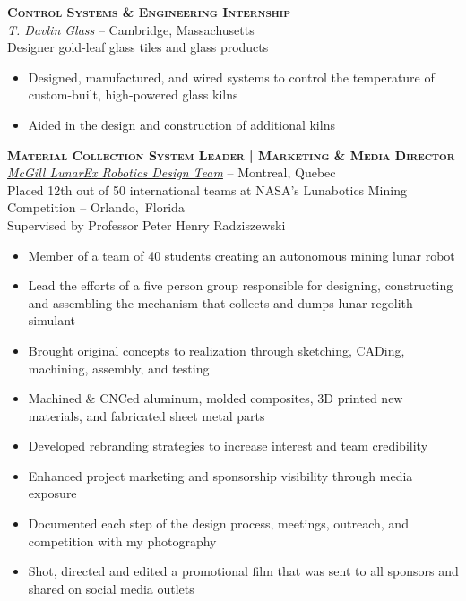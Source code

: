 \documentclass[12pt, letterpaper]{article}
\newcommand{\years}[1]{\marginnote{\footnotesize #1}} %
\begin{document}

	\begin{samepage}
		\years{Summer 2013} \textbf{\scshape Control Systems \& Engineering Internship}\\
		\textit{T. Davlin Glass} -- Cambridge, Massachusetts\\
		{\small Designer gold-leaf glass tiles and glass products}
		\begin{itemize}
			\item Designed, manufactured, and wired systems to control the temperature of custom-built, high-powered glass kilns
			\item Aided in the design and construction of additional kilns
		\end{itemize}
	\end {samepage}
	\vspace{.1in}

	\begin{samepage}
		\years{8/2012 - 8/2013} \textbf{\scshape Material Collection System Leader | Marketing \& Media Director}\\
		\href{http://www.lunarex.mcgill.ca}{\textit{McGill LunarEx Robotics Design Team}} -- Montreal, Quebec\\
		{\small Placed 12th out of 50 international teams at NASA's Lunabotics Mining Competition -- Orlando,~Florida\\
		Supervised by Professor Peter Henry Radziszewski}
		\begin{itemize}
			\item Member of a team of 40 students creating an autonomous mining lunar robot 
			\item Lead the efforts of a five person group responsible for designing, constructing and assembling the mechanism that collects and dumps lunar regolith simulant
			\item Brought original concepts to realization through sketching, CADing, machining, assembly, and testing
			\item Machined \& CNCed aluminum, molded composites, 3D printed new materials, and fabricated sheet metal parts
			\item Developed rebranding strategies to increase interest and team credibility
			\item Enhanced project marketing and sponsorship visibility through media exposure
			\item Documented each step of the design process,  meetings, outreach, and competition with my photography
			\item Shot, directed and edited a promotional film that was sent to all sponsors and shared on social media outlets
		\end{itemize}
	\end {samepage}
	\vspace{.1in}
\end{document}
